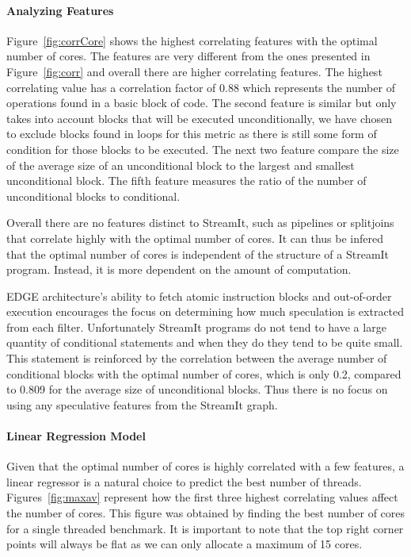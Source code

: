 \paragraph{Analyzing Features}

Figure~\ref{fig:corrCore} shows the highest correlating features with the optimal number of cores.
The features are very different from the ones presented in Figure~\ref{fig:corr} and overall there are higher correlating features.
The highest correlating value has a correlation factor of 0.88 which represents the number of operations found in a basic block of code.
The second feature is similar but only takes into account blocks that will be executed unconditionally, we have chosen to exclude blocks found in loops for this metric as there is still some form of condition for those blocks to be executed.
The next two feature compare the size of the average size of an unconditional block to the largest and smallest unconditional block.
The fifth feature measures the ratio of the number of unconditional blocks to conditional.

Overall there are no features distinct to StreamIt, such as pipelines or splitjoins that correlate highly with the optimal number of cores.
It can thus be infered that the optimal number of cores is independent of the structure of a StreamIt program.
Instead, it is more dependent on the amount of computation.

EDGE architecture's ability to fetch atomic instruction blocks and out-of-order execution encourages the focus on determining how much speculation is extracted from each filter.
Unfortunately StreamIt programs do not tend to have a large quantity of conditional statements and when they do they tend to be quite small.
This statement is reinforced by the correlation between the average number of conditional blocks with the optimal number of cores, which is only 0.2, compared to 0.809 for the average size of unconditional blocks.
Thus there is no focus on using any speculative features from the StreamIt graph.

\paragraph{Linear Regression Model}
Given that the optimal number of cores is highly correlated with a few features, a linear regressor is a natural choice to predict the best number of threads.
Figures~\ref{fig:maxav} represent how the first three highest correlating values affect the number of cores.
This figure was obtained by finding the best number of cores for a single threaded benchmark.
It is important to note that the top right corner points will always be flat as we can only allocate a maximum of 15 cores.

